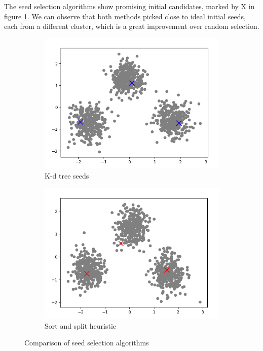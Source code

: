 \documentclass[12pt]{article}
\begin{document}
	The seed selection algorithms show promising initial candidates, marked by X in figure \ref{fig:seeds}. We can observe that both methods picked close to ideal initial seeds, each from a different cluster, which is a great improvement over random selection.
	
	\begin{figure}
		\centering
		\begin{subfigure}{.5\textwidth}
			\centering
			\includegraphics[width=.9\linewidth]{resources/KdSeeds.png}
			\caption{K-d tree seeds}
		\end{subfigure}%
		\begin{subfigure}{.5\textwidth}
			\centering
			\includegraphics[width=.9\linewidth]{resources/SortAndSplitSeeds.png}
			\caption{Sort and split heuristic}
		\end{subfigure}
		\caption{Comparison of seed selection algorithms}
		\label{fig:seeds}
	\end{figure}
\end{document}
